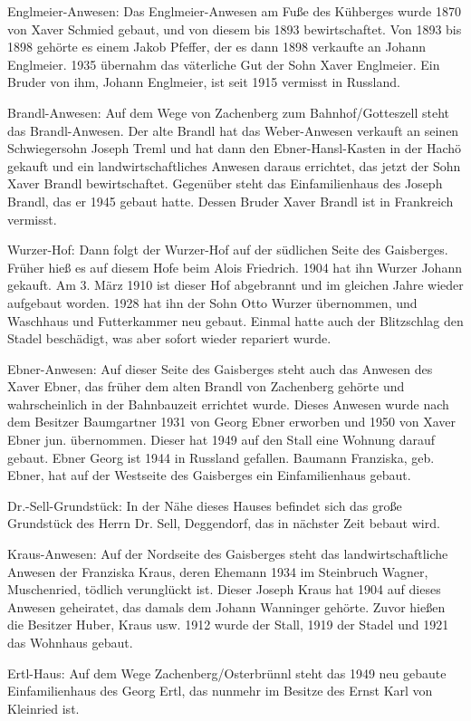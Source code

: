 Englmeier-Anwesen: Das Englmeier-Anwesen am Fuße des Kühberges wurde 1870 von
Xaver Schmied gebaut, und von diesem bis 1893 bewirtschaftet. Von 1893 bis 1898
gehörte es einem Jakob Pfeffer, der es dann 1898 verkaufte an Johann Englmeier.
1935 übernahm das väterliche Gut der Sohn Xaver Englmeier. Ein Bruder von ihm,
Johann Englmeier, ist seit 1915 vermisst in Russland.

Brandl-Anwesen: Auf dem Wege von Zachenberg zum Bahnhof/Gotteszell steht das
Brandl-Anwesen. Der alte Brandl hat das Weber-Anwesen verkauft an seinen
Schwiegersohn Joseph Treml und hat dann den Ebner-Hansl-Kasten in der Hachö
gekauft und ein landwirtschaftliches Anwesen daraus errichtet, das jetzt der
Sohn Xaver Brandl bewirtschaftet. Gegenüber steht das Einfamilienhaus des Joseph
Brandl, das er 1945 gebaut hatte. Dessen Bruder Xaver Brandl ist in Frankreich
vermisst.

Wurzer-Hof: Dann folgt der Wurzer-Hof auf der südlichen Seite des Gaisberges.
Früher hieß es auf diesem Hofe beim Alois Friedrich. 1904 hat ihn Wurzer Johann
gekauft. Am 3. März 1910 ist dieser Hof abgebrannt und im gleichen Jahre wieder
aufgebaut worden. 1928 hat ihn der Sohn Otto Wurzer übernommen, und Waschhaus
und Futterkammer neu gebaut. Einmal hatte auch der Blitzschlag den Stadel
beschädigt, was aber sofort wieder repariert wurde.

Ebner-Anwesen: Auf dieser Seite des Gaisberges steht auch das Anwesen des Xaver
Ebner, das früher dem alten Brandl von Zachenberg gehörte und wahrscheinlich in
der Bahnbauzeit errichtet wurde. Dieses Anwesen wurde nach dem Besitzer
Baumgartner 1931 von Georg Ebner erworben und 1950 von Xaver Ebner jun.
übernommen. Dieser hat 1949 auf den Stall eine Wohnung darauf gebaut. Ebner
Georg ist 1944 in Russland gefallen. Baumann Franziska, geb. Ebner, hat auf der
Westseite des Gaisberges ein Einfamilienhaus gebaut.

Dr.-Sell-Grundstück: In der Nähe dieses Hauses befindet sich das große
Grundstück des Herrn Dr. Sell, Deggendorf, das in nächster Zeit bebaut wird.

Kraus-Anwesen: Auf der Nordseite des Gaisberges steht das landwirtschaftliche
Anwesen der Franziska Kraus, deren Ehemann 1934 im Steinbruch Wagner,
Muschenried, tödlich verunglückt ist. Dieser Joseph Kraus hat 1904 auf dieses
Anwesen geheiratet, das damals dem Johann Wanninger gehörte. Zuvor hießen die
Besitzer Huber, Kraus usw. 1912 wurde der Stall, 1919 der Stadel und 1921 das
Wohnhaus gebaut.

Ertl-Haus: Auf dem Wege Zachenberg/Osterbrünnl steht das 1949 neu gebaute
Einfamilienhaus des Georg Ertl, das nunmehr im Besitze des Ernst Karl von
Kleinried ist.

